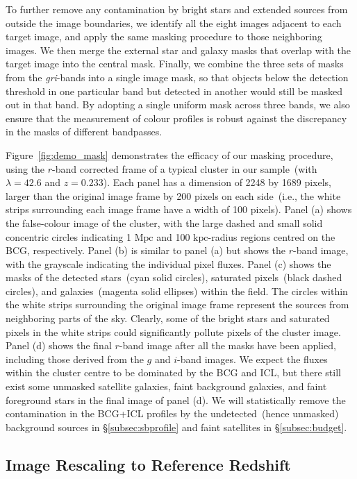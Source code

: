 \documentclass[fleqn,usenatbib]{mnras}
\newcommand{\mpc}{\mathrm{Mpc}}
\newcommand{\kpc}{\mathrm{kpc}}
\begin{document}
To further remove any contamination by bright stars and extended sources
from outside the image boundaries, we identify all the eight images
adjacent to each target image, and apply the same masking procedure to
those neighboring images.  We then merge the external star and galaxy masks
that overlap with the target image into the central mask. Finally, we
combine the three sets of masks from the {\it gri}-bands into a single
image mask, so that objects below the detection threshold in one particular
band but detected in another would still be masked out in that band. By
adopting a single uniform mask across three bands, we also ensure that the
measurement of colour profiles is robust against the discrepancy in the
masks of different bandpasses.


Figure~\ref{fig:demo_mask} demonstrates the efficacy of our masking
procedure, using the $r$-band corrected frame of a typical cluster in our
sample~(with $\lambda{=}42.6$ and $z{=}0.233$). Each panel has a dimension
of 2248 by 1689 pixels, larger than the original image frame by
200 pixels on each side~(i.e., the white strips surrounding each image
frame have a width of 100 pixels). Panel (a) shows the false-colour image
of the cluster, with the large dashed and small solid concentric circles
indicating 1 $\mpc$ and 100 $\kpc$-radius regions centred on the BCG,
respectively.  Panel (b) is similar to panel (a) but shows the $r$-band
image, with the grayscale indicating the individual pixel fluxes.  Panel
(c) shows the masks of the detected stars~(cyan solid circles), saturated
pixels~(black dashed circles), and galaxies~(magenta solid ellipses) within
the field. The circles within the white strips surrounding the original
image frame represent the sources from neighboring parts of the sky.
Clearly, some of the bright stars and saturated pixels in the white strips
could significantly pollute pixels of the cluster image. Panel (d)
shows the final $r$-band image after all the masks have been applied,
including those derived from the $g$ and $i$-band images. We expect the
fluxes within the cluster centre to be dominated by the BCG and ICL, but
there still exist some unmasked satellite galaxies, faint background
galaxies, and faint foreground stars in the final image of panel (d). We
will statistically remove the contamination in the BCG+ICL profiles by the
undetected~(hence unmasked) background sources in \S\ref{subsec:sbprofile}
and faint satellites in \S\ref{subsec:budget}.




\subsection{Image Rescaling to Reference Redshift}
\label{subsec:rescale}
\end{document}
